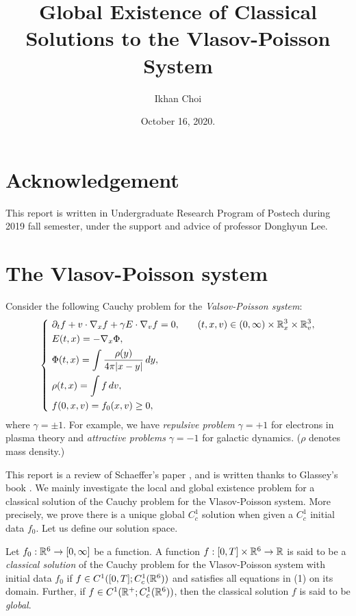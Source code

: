 \documentclass{article}
\title{Global Existence of Classical Solutions to the Vlasov-Poisson System}
\author{Ikhan Choi}
\date{October 16, 2020.}
\begin{document}
\maketitle
\tableofcontents

\section*{Acknowledgement}
This report is written in Undergraduate Research Program of Postech during 2019 fall semester, under the support and advice of professor Donghyun Lee.


\clearpage
\section{The Vlasov-Poisson system}
Consider the following Cauchy problem for the \emph{Valsov-Poisson system}:
\begin{align}
\left\{\ \begin{alignedat}{2}
&\pd_tf+v\cdot\nabla_xf+\gamma E\cdot\nabla_vf=0,&&\qquad(t,x,v)\in(0,\infty)\times\R_x^3\times\R_v^3,\\
&E(t,x)=-\nabla_x\Phi,\\
&\Phi(t,x)=\int\frac{\rho(y)}{4\pi|x-y|}\,dy,\\
&\rho(t,x)=\int f\,dv,\\
&f(0,x,v)=f_0(x,v)\ge0,
\end{alignedat}\right.
\end{align}
where $\gamma=\pm1$.
For example, we have \emph{repulsive problem} $\gamma=+1$ for electrons in plasma theory and \emph{attractive problems} $\gamma=-1$ for galactic dynamics.
($\rho$ denotes mass density.)

This report is a review of Schaeffer's paper \cite{schaeffer1991global}, and is written thanks to Glassey's book \cite{glassey1996cauchy}.
We mainly investigate the local and global existence problem for a classical solution of the Cauchy problem for the Vlasov-Poisson system.
More precisely, we prove there is a unique global $C_c^1$ solution when given a $C_c^1$ initial data $f_0$.
Let us define our solution space.

\begin{defn*}
Let $f_0:\mathbb{R}^6\to[0,\infty]$ be a function.
A function $f:[0,T]\times\mathbb{R}^6\to\mathbb{R}$ is said to be a \emph{classical solution} of the Cauchy problem for the Vlasov-Poisson system with initial data $f_0$ if $f\in C^1([0,T];C_c^1(\mathbb{R}^6))$ and satisfies all equations in (1) on its domain.
Further, if $f\in C^1(\mathbb{R}^+;C_c^1(\mathbb{R}^6))$, then the classical solution $f$ is said to be \emph{global}.
\end{defn*}
\end{document}
